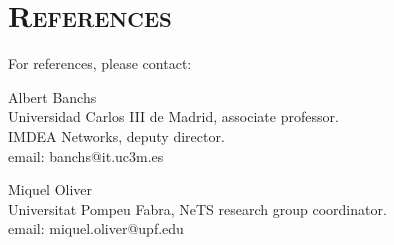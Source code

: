 \documentclass[line,margin]{res}
\begin{document}
\section{\textsc{References}}
For references, please contact:


Albert Banchs\\
Universidad Carlos III de Madrid, associate professor.\\
IMDEA Networks, deputy director.\\
email: banchs@it.uc3m.es

Miquel Oliver \\
Universitat Pompeu Fabra, NeTS research group coordinator.\\
email: miquel.oliver@upf.edu








\end{document}
